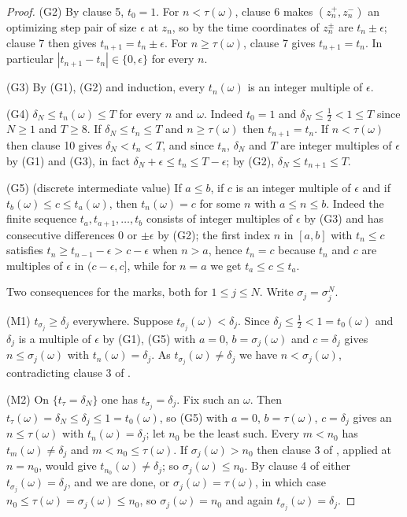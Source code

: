\begin{proof}
(G2) By clause 5, $t_0=1$. For $n<\tau(\omega)$, clause 6 makes
$(z^+_n,z^-_n)$ an optimizing step pair of size $\epsilon$ at $z_n$, so by
 the time coordinates of $z^\pm_n$ are $t_n\pm\epsilon$;
clause 7 then gives $t_{n+1}=t_n\pm\epsilon$. For $n\ge\tau(\omega)$, clause 7
gives $t_{n+1}=t_n$. In particular $|t_{n+1}-t_n|\in\{0,\epsilon\}$ for every
$n$.

(G3) By (G1), (G2) and induction, every $t_n(\omega)$ is an integer multiple of
$\epsilon$.

(G4) $\delta_N\le t_n(\omega)\le T$ for every $n$ and $\omega$. Indeed
$t_0=1$ and $\delta_N\le\tfrac12<1\le T$ since $N\ge1$ and $T\ge8$. If
$\delta_N\le t_n\le T$ and $n\ge\tau(\omega)$ then $t_{n+1}=t_n$. If
$n<\tau(\omega)$ then clause 10 gives $\delta_N<t_n<T$, and since $t_n$,
$\delta_N$ and $T$ are integer multiples of $\epsilon$ by (G1) and (G3), in
fact $\delta_N+\epsilon\le t_n\le T-\epsilon$; by (G2),
$\delta_N\le t_{n+1}\le T$.

(G5) (discrete intermediate value) If $a\le b$, if $c$ is an integer multiple
of $\epsilon$ and if $t_b(\omega)\le c\le t_a(\omega)$, then $t_n(\omega)=c$
for some $n$ with $a\le n\le b$. Indeed the finite sequence
$t_a,t_{a+1},\dots,t_b$ consists of integer multiples of $\epsilon$ by (G3) and
has consecutive differences $0$ or $\pm\epsilon$ by (G2); the first index $n$
in $[a,b]$ with $t_n\le c$ satisfies $t_n\ge t_{n-1}-\epsilon>c-\epsilon$ when
$n>a$, hence $t_n=c$ because $t_n$ and $c$ are multiples of $\epsilon$ in
$(c-\epsilon,c]$, while for $n=a$ we get $t_a\le c\le t_a$.

Two consequences for the marks, both for $1\le j\le N$. Write
$\sigma_j=\sigma^N_j$.

(M1) $t_{\sigma_j}\ge\delta_j$ everywhere. Suppose $t_{\sigma_j}(\omega)<\delta_j$.
Since $\delta_j\le\tfrac12<1=t_0(\omega)$ and $\delta_j$ is a multiple of
$\epsilon$ by (G1), (G5) with $a=0$, $b=\sigma_j(\omega)$ and $c=\delta_j$ gives
$n\le\sigma_j(\omega)$ with $t_n(\omega)=\delta_j$. As
$t_{\sigma_j}(\omega)\ne\delta_j$ we have $n<\sigma_j(\omega)$, contradicting
clause 3 of .

(M2) On $\{t_\tau=\delta_N\}$ one has $t_{\sigma_j}=\delta_j$. Fix such an
$\omega$. Then $t_\tau(\omega)=\delta_N\le\delta_j\le1=t_0(\omega)$, so (G5)
with $a=0$, $b=\tau(\omega)$, $c=\delta_j$ gives an $n\le\tau(\omega)$ with
$t_n(\omega)=\delta_j$; let $n_0$ be the least such. Every $m<n_0$ has
$t_m(\omega)\ne\delta_j$ and $m<n_0\le\tau(\omega)$. If $\sigma_j(\omega)>n_0$
then clause 3 of , applied at $n=n_0$, would give
$t_{n_0}(\omega)\ne\delta_j$; so $\sigma_j(\omega)\le n_0$. By clause 4 of
 either $t_{\sigma_j}(\omega)=\delta_j$, and we are done, or
$\sigma_j(\omega)=\tau(\omega)$, in which case
$n_0\le\tau(\omega)=\sigma_j(\omega)\le n_0$, so $\sigma_j(\omega)=n_0$ and
again $t_{\sigma_j}(\omega)=\delta_j$.


\end{proof}
